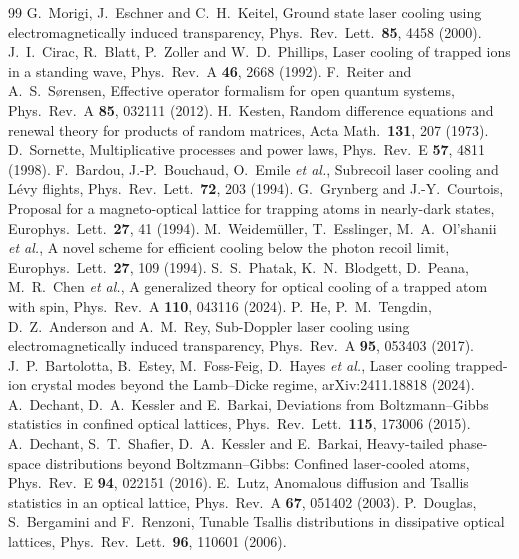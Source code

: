 \documentclass[11pt,a4paper]{article}
\begin{document}
\begin{thebibliography}{99}
 G.~Morigi, J.~Eschner and C.~H.~Keitel, Ground state laser cooling using electromagnetically induced transparency, Phys.\ Rev.\ Lett.\ \textbf{85}, 4458 (2000).
 J.~I.~Cirac, R.~Blatt, P.~Zoller and W.~D.~Phillips, Laser cooling of trapped ions in a standing wave, Phys.\ Rev.\ A \textbf{46}, 2668 (1992).
 F.~Reiter and A.~S.~S{\o}rensen, Effective operator formalism for open quantum systems, Phys.\ Rev.\ A \textbf{85}, 032111 (2012).
 H.~Kesten, Random difference equations and renewal theory for products of random matrices, Acta Math.\ \textbf{131}, 207 (1973).
 D.~Sornette, Multiplicative processes and power laws, Phys.\ Rev.\ E \textbf{57}, 4811 (1998).
 F.~Bardou, J.-P.~Bouchaud, O.~Emile \emph{et al.}, Subrecoil laser cooling and Lévy flights, Phys.\ Rev.\ Lett.\ \textbf{72}, 203 (1994).
 G.~Grynberg and J.-Y.~Courtois, Proposal for a magneto-optical lattice for trapping atoms in nearly-dark states, Europhys.\ Lett.\ \textbf{27}, 41 (1994).
 M.~Weidemüller, T.~Esslinger, M.~A.~Ol'shanii \emph{et al.}, A novel scheme for efficient cooling below the photon recoil limit, Europhys.\ Lett.\ \textbf{27}, 109 (1994).
 S.~S.~Phatak, K.~N.~Blodgett, D.~Peana, M.~R.~Chen \emph{et al.}, A generalized theory for optical cooling of a trapped atom with spin, Phys.\ Rev.\ A \textbf{110}, 043116 (2024).
 P.~He, P.~M.~Tengdin, D.~Z.~Anderson and A.~M.~Rey, Sub-Doppler laser cooling using electromagnetically induced transparency, Phys.\ Rev.\ A \textbf{95}, 053403 (2017).
 J.~P.~Bartolotta, B.~Estey, M.~Foss-Feig, D.~Hayes \emph{et al.}, Laser cooling trapped-ion crystal modes beyond the Lamb--Dicke regime, arXiv:2411.18818 (2024).
 A.~Dechant, D.~A.~Kessler and E.~Barkai, Deviations from Boltzmann--Gibbs statistics in confined optical lattices, Phys.\ Rev.\ Lett.\ \textbf{115}, 173006 (2015).
 A.~Dechant, S.~T.~Shafier, D.~A.~Kessler and E.~Barkai, Heavy-tailed phase-space distributions beyond Boltzmann--Gibbs: Confined laser-cooled atoms, Phys.\ Rev.\ E \textbf{94}, 022151 (2016).
 E.~Lutz, Anomalous diffusion and Tsallis statistics in an optical lattice, Phys.\ Rev.\ A \textbf{67}, 051402 (2003).
 P.~Douglas, S.~Bergamini and F.~Renzoni, Tunable Tsallis distributions in dissipative optical lattices, Phys.\ Rev.\ Lett.\ \textbf{96}, 110601 (2006).

\end{thebibliography}
\end{document}
